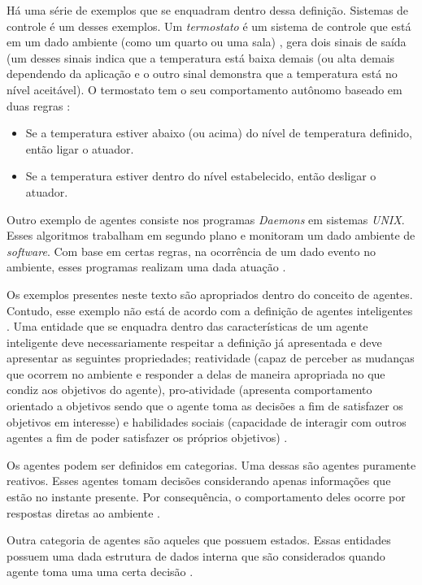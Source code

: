 Há uma série de exemplos que se enquadram dentro dessa definição. Sistemas de controle é um desses exemplos. Um \textit{termostato} é um sistema de controle que está em um dado ambiente (como um quarto ou uma sala) \cite{whatisagent}, gera dois sinais de saída (um desses sinais indica que a temperatura está baixa demais (ou alta demais dependendo da aplicação e o outro sinal
demonstra que a temperatura está no nível aceitável). O termostato tem o seu comportamento autônomo baseado em duas regras \cite{whatisagent}:

\begin{itemize}
    \item Se a temperatura estiver abaixo (ou acima) do nível de temperatura definido, então ligar o atuador.
    \item Se a temperatura estiver dentro do nível estabelecido, então desligar o atuador.
\end{itemize}

Outro exemplo de agentes consiste nos programas \textit{Daemons} em sistemas \textit{UNIX}. Esses algoritmos trabalham em segundo plano e monitoram um dado ambiente de \textit{software}. Com base em certas regras, na ocorrência de um dado evento no ambiente, esses programas realizam uma dada atuação \cite{whatisagent}.   

Os exemplos presentes neste texto são apropriados dentro do conceito de agentes. Contudo, esse exemplo não está de acordo com a definição de agentes inteligentes \cite{whatisagent}. Uma entidade que se enquadra dentro das características de um agente inteligente deve necessariamente respeitar a definição já apresentada e deve apresentar as seguintes propriedades; reatividade (capaz de perceber as mudanças
que ocorrem no ambiente e responder a delas de maneira apropriada no que condiz aos objetivos do agente), pro-atividade (apresenta comportamento orientado a objetivos sendo que o agente toma as decisões a fim de satisfazer os objetivos em interesse) e habilidades sociais (capacidade de interagir com outros agentes a fim de poder satisfazer os próprios objetivos) \cite{whatisagent} \cite{artificialinteligencemodermapproach}.

Os agentes podem ser definidos em categorias. Uma dessas são agentes puramente reativos. Esses agentes tomam decisões considerando apenas informações que estão no instante presente. Por consequência, o comportamento deles ocorre por respostas diretas ao ambiente \cite{whatisagent}. 

Outra categoria de agentes são aqueles que possuem estados. Essas entidades possuem uma dada estrutura de dados interna que são considerados quando agente toma uma uma certa decisão \cite{whatisagent}.

